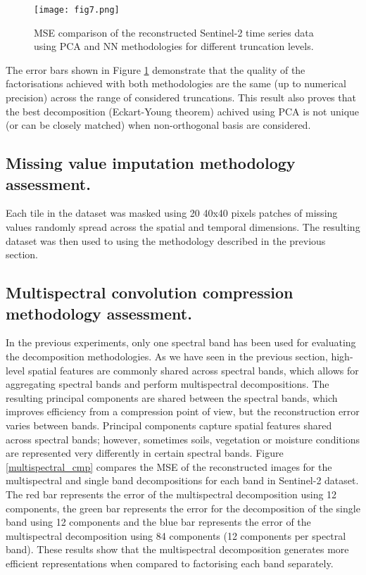 \documentclass[essd, manuscript]{copernicus}
\begin{document}
\begin{figure}%
    \texttt{[image: fig7.png]}
    \caption{MSE comparison of the reconstructed Sentinel-2 time series data using PCA and NN methodologies for different truncation levels.}%
    \label{components_error}%
\end{figure}

The error bars shown in Figure \ref{components_error} demonstrate that the quality of the factorisations achieved with both methodologies are the same (up to numerical precision) across the range of considered truncations. This result also proves that the best decomposition (Eckart-Young theorem) achived using PCA is not unique (or can be closely matched) when non-orthogonal basis are considered.

\subsection{Missing value imputation methodology assessment.}
Each tile in the dataset was masked using 20 40x40 pixels patches of missing values randomly spread across the spatial and temporal dimensions. The resulting dataset was then used to  using the methodology described in the previous section. 

\subsection{Multispectral convolution compression methodology assessment.}
In the previous experiments, only one spectral band has been used for evaluating the decomposition methodologies. As we have seen in the previous section, high-level spatial features are commonly shared across spectral bands, which allows for aggregating spectral bands and perform multispectral decompositions. The resulting principal components are shared between the spectral bands, which improves efficiency from a compression point of view, but the reconstruction error varies between bands. Principal components capture spatial features shared across spectral bands; however, sometimes soils, vegetation or moisture conditions are represented very differently in certain spectral bands. Figure \ref{multispectral_cmp} compares the MSE of the reconstructed images for the multispectral and single band decompositions for each band in Sentinel-2 dataset. The red bar represents the error of the multispectral decomposition using 12 components, the green bar represents the error for the decomposition of the single band using 12 components and the blue bar represents the error of the multispectral decomposition using 84 components (12 components per spectral band). These results show that the multispectral decomposition generates more efficient representations when compared to factorising each band separately. 
\end{document}
